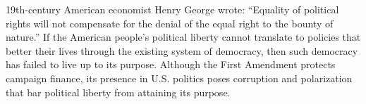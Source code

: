 19th-century American economist Henry George wrote: “Equality of political rights will not compensate for the denial of the equal right to the bounty of nature.” If the American people's political liberty cannot translate to policies that better their lives through the existing system of democracy, then such democracy has failed to live up to its purpose. Although the First Amendment protects campaign finance, its presence in U.S. politics poses corruption and polarization that bar political liberty from attaining its purpose. 

